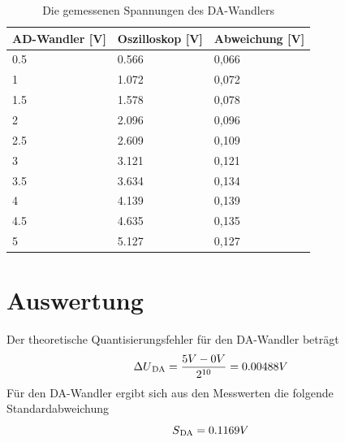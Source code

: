 \documentclass[12pt, oneside, a4paper, \docLanguage]{report}
\begin{document}
\begin{table}[H]
\centering
\begin{tabular}{|l|l|l|}
\hline
\textbf{AD-Wandler {[}V{]}} & \textbf{Oszilloskop {[}V{]}} & \textbf{Abweichung {[}V{]}} \\ \hline
0.5                         & 0.566                        & 0,066                       \\ \hline
1                           & 1.072                        & 0,072                       \\ \hline
1.5                         & 1.578                        & 0,078                       \\ \hline
2                           & 2.096                        & 0,096                       \\ \hline
2.5                         & 2.609                        & 0,109                       \\ \hline
3                           & 3.121                        & 0,121                       \\ \hline
3.5                         & 3.634                        & 0,134                       \\ \hline
4                           & 4.139                        & 0,139                       \\ \hline
4.5                         & 4.635                        & 0,135                       \\ \hline
5                           & 5.127                        & 0,127                       \\ \hline
\end{tabular}
\caption{Die gemessenen Spannungen des DA-Wandlers}
\label{fig:VERSUCH_2_messungen}
\end{table}

\section{Auswertung}
\label{chap:VERSUCH_2_AUSWERTUNG}
Der theoretische Quantisierungsfehler für den DA-Wandler beträgt
\begin{equation*}
\Delta U\textsubscript{DA} = \frac{5V - 0V}{2\textsuperscript{10}} = 0.00488V
\end{equation*}
Für den DA-Wandler ergibt sich aus den Messwerten die folgende Standardabweichung
\begin{equation*}
S\textsubscript{DA} = 0.1169V
\end{equation*}
\end{document}
